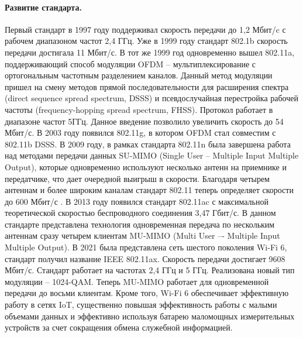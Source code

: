 \paragraph{Развитие стандарта.}
Первый стандарт в 1997 году поддерживал скорость передачи до 1,2 Мбит/c с рабочем диапазоном частот 2,4 ГГц. Уже в 1999 году стандарт 802.1b скорость передачи достигала 11 Мбит/с. В тот же 1999 год одновременно вышел 802.11a, поддерживающий способ модуляции OFDM -- мультиплексирование с ортогональным частотным разделением каналов. Данный метод модуляции пришел на смену методов прямой последовательности для расширения спектра (direct sequence spread spectrum, DSSS) и псевдослучайная перестройка рабочей частоты (frequency-hopping spread spectrum, FHSS). Протокол работает в диапазоне частот 5ГГц. Данное введение позволило увеличить скорость до 54 Мбит/с. В 2003 году появился 802.11g, в котором OFDM стал совместим с 802.11b DSSS.  В 2009 году, в рамках стандарта 802.11n была завершена работа над методами передачи данных SU-MIMO (Single User -- Multiple Input Multiple Output), которые одновременно используют несколько антенн на приемнике и передатчике, что дает очередной выигрыш в скорости. Благодаря четырем антеннам и более широким каналам стандарт 802.11 теперь определяет скорости до 600 Мбит/с \cite{Tanenbaum2022, Coleman2018}. В 2013 году появился стандарт 802.11ac с максимальной теоретической скоростью беспроводного соединения 3,47 Гбит/с. В данном стандарте представлена технология одновременная передача по нескольким антеннам сразу четырем клиентам MU-MIMO (Multi User –- Multiple Input Multiple Output). В 2021 была представлена сеть шестого поколения Wi-Fi 6, стандарт получил название IEEE 802.11ax. Скорость передачи достигает 9608 Мбит/с. Стандарт работает на частотах 2,4 ГГц и 5 ГГц. Реализована новый тип модуляции -- 1024-QAM. Теперь MU-MIMO работает для одновременной передачи до восьми клиентам.  Кроме того, Wi-Fi 6 обеспечивает эффективную работу в сетях IoT, существенно повышая эффективность работы с малыми объемами данных и эффективно используя батарею маломощных измерительных устройств за счет сокращения обмена служебной информацией.

